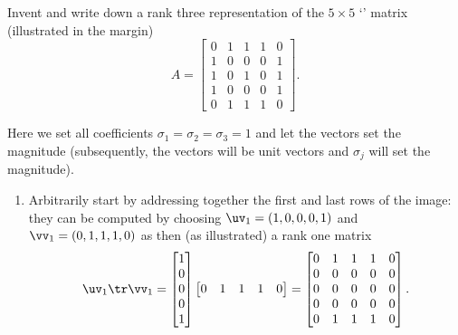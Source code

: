 \begin{example} \label{eg:}
Invent and write down a rank three representation of the \(5\times5\) `' matrix (illustrated in the margin)
\marginpar{}
\begin{equation*}
A=\begin{bmatrix} 0&1&1&1&0
\\1&0&0&0&1
\\1&0&1&0&1
\\1&0&0&0&1
\\0&1&1&1&0 \end{bmatrix}.
\end{equation*}
\begin{solution} 
Here we set all coefficients \(\sigma_1=\sigma_2=\sigma_3=1\) and let the vectors set the magnitude (subsequently, the vectors will be unit vectors and \(\sigma_j\) will set the magnitude).
\begin{enumerate}
\item Arbitrarily start by addressing together the first and last rows of the image: they can be computed by choosing  \(\uv_1=(1,0,0,0,1)\) and \(\vv_1=(0,1,1,1,0)\) as then (as illustrated) a rank one matrix
\marginpar{}
\begin{equation*}
\uv_1\tr\vv_1
=\begin{bmatrix} 1\\0\\0\\0\\1 \end{bmatrix}
\begin{bmatrix} 0&1&1&1&0 \end{bmatrix}
=\begin{bmatrix} 0&1&1&1&0
\\0&0&0&0&0
\\0&0&0&0&0
\\0&0&0&0&0
\\0&1&1&1&0 \end{bmatrix}.
\end{equation*}


\end{enumerate}
\end{solution}
\end{example}
